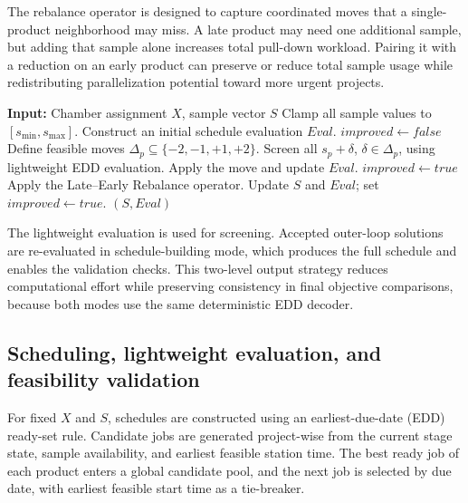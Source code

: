 \documentclass[11pt]{article}
\begin{document}
The rebalance operator is designed to capture coordinated moves that a single-product neighborhood may miss. A late product may need one additional sample, but adding that sample alone increases total pull-down workload. Pairing it with a reduction on an early product can preserve or reduce total sample usage while redistributing parallelization potential toward more urgent projects.

\begin{algorithm}[H]
\caption{Sample-size local search}
\label{alg:sample_ls_short}
\begin{algorithmic}[1]
\State \textbf{Input:} Chamber assignment \(X\), sample vector \(S\)
\State Clamp all sample values to \([s_{\min},s_{\max}]\).
\State Construct an initial schedule evaluation \(Eval\).
\Repeat
    \State \(improved\leftarrow false\)
        \State Define feasible moves \(\Delta_p\subseteq\{-2,-1,+1,+2\}\).
        \State Screen all \(s_p+\delta\), \(\delta\in\Delta_p\), using lightweight EDD evaluation.
            \State Apply the move and update \(Eval\).
            \State \(improved\leftarrow true\)
        \EndIf
    \EndFor
    \State Apply the Late--Early Rebalance operator.
        \State Update \(S\) and \(Eval\); set \(improved\leftarrow true\).
    \EndIf
{}
\State \Return \((S,Eval)\)
\end{algorithmic}
\end{algorithm}

The lightweight evaluation is used for screening. Accepted outer-loop solutions are re-evaluated in schedule-building mode, which produces the full schedule and enables the validation checks. This two-level output strategy reduces computational effort while preserving consistency in final objective comparisons, because both modes use the same deterministic EDD decoder.

\subsection{Scheduling, lightweight evaluation, and feasibility validation}
\label{subsec:scheduling}

For fixed \(X\) and \(S\), schedules are constructed using an earliest-due-date (EDD) ready-set rule. Candidate jobs are generated project-wise from the current stage state, sample availability, and earliest feasible station time. The best ready job of each product enters a global candidate pool, and the next job is selected by due date, with earliest feasible start time as a tie-breaker.
\end{document}
